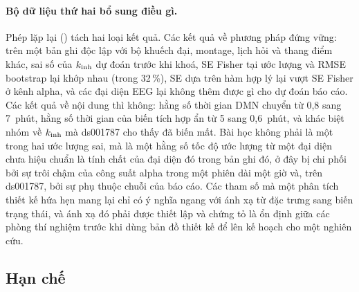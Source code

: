 \paragraph{Bộ dữ liệu thứ hai bổ sung điều gì.} Phép lặp lại () tách hai loại kết quả. Các kết quả về phương pháp đứng vững: trên một bản ghi độc lập với bộ khuếch đại, montage, lịch hỏi và thang điểm khác, sai số của $k_{\mathrm{inh}}$ dự đoán trước khi khoá, SE Fisher tại ước lượng và RMSE bootstrap lại khớp nhau (trong 32\,\%), SE dựa trên hàm hợp lý lại vượt SE Fisher ở kênh alpha, và các đại diện EEG lại không thêm được gì cho dự đoán báo cáo. Các kết quả về nội dung thì không: hằng số thời gian DMN chuyển từ 0,8 sang 7~phút, hằng số thời gian của biến tích hợp ẩn từ 5 sang 0,6~phút, và khác biệt nhóm về $k_{\mathrm{inh}}$ mà ds001787 cho thấy đã biến mất. Bài học không phải là một trong hai ước lượng sai, mà là một hằng số tốc độ ước lượng từ một đại diện chưa hiệu chuẩn là tính chất của đại diện đó trong bản ghi đó, ở đây bị chi phối bởi sự trôi chậm của công suất alpha trong một phiên dài một giờ và, trên ds001787, bởi sự phụ thuộc chuỗi của báo cáo. Các tham số mà một phân tích thiết kế hứa hẹn mang lại chỉ có ý nghĩa ngang với ánh xạ từ đặc trưng sang biến trạng thái, và ánh xạ đó phải được thiết lập và chứng tỏ là ổn định giữa các phòng thí nghiệm trước khi dùng bản đồ thiết kế để lên kế hoạch cho một nghiên cứu.

\subsection{Hạn chế}
\label{sec:limitations}

